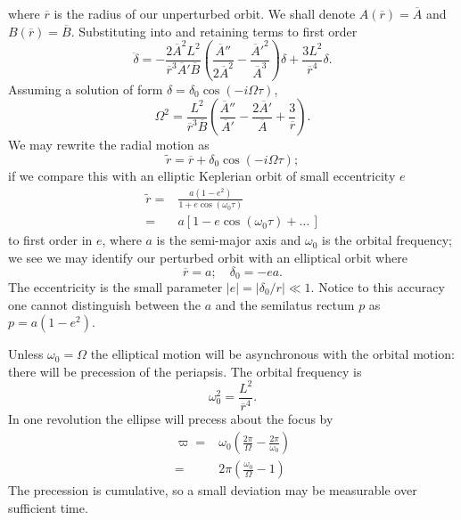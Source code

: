 where $\overline{r}$ is the radius of our unperturbed orbit. We shall denote $A(\overline{r}) = \overline{A}$ and $B(\overline{r}) = \overline{B}$. Substituting into  and retaining terms to first order
\begin{equation}
\ddot{\delta} = - \frac{2\overline{A}^2L^2}{\overline{r}^3\overline{A}'\overline{B}}\left(\frac{\overline{A}''}{2\overline{A}^2} - \frac{{\overline{A}'}^2}{\overline{A}^3}\right)\delta + \frac{3L^2}{\overline{r}^4}\delta.
\end{equation}
Assuming a solution of form $\delta = \delta_0\cos(-i\Omega\tau)$,
\begin{equation}
\Omega^2 = \frac{L^2}{\overline{r}^3\overline{B}}\left(\frac{\overline{A}''}{\overline{A}'} - \frac{2\overline{A}'}{\overline{A}} + \frac{3}{\overline{r}}\right).
\end{equation}
We may rewrite the radial motion as
\begin{equation}
\widetilde{r} = \overline{r} + \delta_0\cos(-i\Omega\tau);
\end{equation}
if we compare this with an elliptic Keplerian orbit of small eccentricity $e$
\begin{align}
\widetilde{r} = {} & \frac{a(1 - e^2)}{1 + e\cos(\omega_0\tau)} \\
 = {} & a\left[1 - e\cos(\omega_0\tau) + \ldots \, \right]
\end{align}
to first order in $e$, where $a$ is the semi-major axis and $\omega_0$ is the orbital frequency; we see we may identify our perturbed orbit with an elliptical orbit where\cite{Kerner2001a}
\begin{equation}
\overline{r} = a; \quad \delta_0 = -ea.
\end{equation}
The eccentricity is the small parameter $|e| = |\delta_0/r| \ll 1$. Notice to this accuracy one cannot distinguish between the $a$ and the semilatus rectum $p$ as $p = a(1 - e^2)$.

Unless $\omega_0 = \Omega$ the elliptical motion will be asynchronous with the orbital motion: there will be precession of the periapsis. The orbital frequency is
\begin{equation}
\omega_0^2 = \frac{L^2}{\overline{r}^4}.
\end{equation}
In one revolution the ellipse will precess about the focus by
\begin{align}
\varpi = {} & \omega_0\left(\frac{2\pi}{\Omega} - \frac{2\pi}{\omega_0}\right) \nonumber \\
 = {} & 2\pi\left(\frac{\omega_0}{\Omega} - 1\right)
\end{align}
The precession is cumulative, so a small deviation may be measurable over sufficient time.

